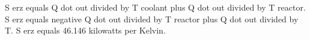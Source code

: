S erz equals Q dot out divided by T coolant plus Q dot out divided by T reactor.  
S erz equals negative Q dot out divided by T reactor plus Q dot out divided by T.  
S erz equals 46.146 kilowatts per Kelvin.